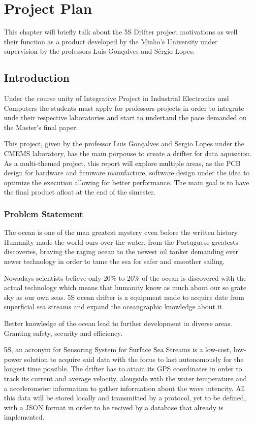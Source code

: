\chapter{Project Plan}
    This chapter will briefly talk about the 5S Drifter project motivations as well their function as a product developed 
    by the Minho's University under supervision by the professors Luis Gonçalves and Sérgio Lopes.
\section{Introduction}
Under the course unity of Integrative Project in Industrial Electronics and Computers the students must
apply for professors projects in order to integrate unde their respective laboratories and start to undertand the pace
demanded on the Master's final paper.

This project, given by the professor Luis Gonçalves and Sergio Lopes under the CMEMS laboratory,
has the main porpouse to create a drifter for data aquisition. As a multi-themed project, this report will
explore multiple areas, as the PCB design for hardware and firmware manufacture, software design under the idea to optimize
the execution allowing for better performance. The main goal is to have the final product afloat at the end of the simester.

\subsection{Problem Statement}
The ocean is one of the man greatest mystery even before the written history. Humanity made the world ours over the water, 
from the Portuguese greatests discoveries, braving the raging ocean to the newest oil tanker demanding ever newer technology
in order to tame the sea for safer and smoother sailing.

Nowadays scientists believe only 20\% to 26\% of the ocean is discovered with the actual technology which means that humanity 
know as much about our so grate sky as our own seas. 5S ocean drifter is a equipment made to acquire date from 
superficial sea streams and expand the oceangraphic knowledge about it.

Better knowledge of the ocean lead to further development in diverse areas. Granting safety,
security and efficiency.

5S, an acronym for Sensoring System for Surface Sea Streams is a low-cost, low-power solution to acquire
said data with the focus to last autonomously for the longest time possible. The drifter has to attain its GPS
coordinates in order to track its current and average velocity, alongside with the water temperature and a accelerometer 
information to gather information about the wave intencity. All this data will be stored locally and transmitted by a protocol,
yet to be defined, with a JSON format in order to be recived by a database that already is implemented.  


